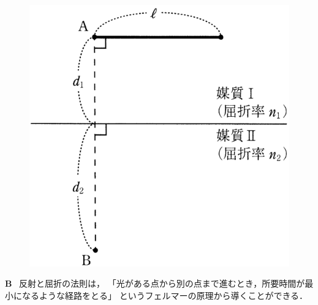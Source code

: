 \begin{figure}[H]
\begin{minipage}{.3\columnwidth}
    \includegraphics[width=\columnwidth]{../graphs/chiba_23_6-2.png}
    \caption{} 
  \end{minipage}
\end{figure}

\noindent\textsf{\bfseries B}
\ 
反射と屈折の法則は，
「光がある点から別の点まで進むとき，所要時間が最小になるような経路をとる」
というフェルマーの原理から導くことができる．

